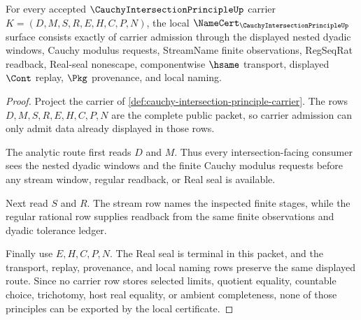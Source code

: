 \begin{theorem}
\label{thm:cauchy-intersection-principle-namecert-obligations}
For every accepted $\CauchyIntersectionPrincipleUp$ carrier $K=(D,M,S,R,E,H,C,P,N)$, the local $\NameCert_{\CauchyIntersectionPrincipleUp}$ surface consists exactly of carrier admission through the displayed nested dyadic windows, Cauchy modulus requests, StreamName finite observations, RegSeqRat readback, Real-seal nonescape, componentwise $\hsame$ transport, displayed $\Cont$ replay, $\Pkg$ provenance, and local naming.
\end{theorem}
\begin{proof}
Project the carrier of \autoref{def:cauchy-intersection-principle-carrier}. The rows $D,M,S,R,E,H,C,P,N$ are the complete public packet, so carrier admission can only admit data already displayed in those rows.

The analytic route first reads $D$ and $M$. Thus every intersection-facing consumer sees the nested dyadic windows and the finite Cauchy modulus requests before any stream window, regular readback, or Real seal is available.

Next read $S$ and $R$. The stream row names the inspected finite stages, while the regular rational row supplies readback from the same finite observations and dyadic tolerance ledger.

Finally use $E,H,C,P,N$. The Real seal is terminal in this packet, and the transport, replay, provenance, and local naming rows preserve the same displayed route. Since no carrier row stores selected limits, quotient equality, countable choice, trichotomy, host real equality, or ambient completeness, none of those principles can be exported by the local certificate.
\end{proof}

